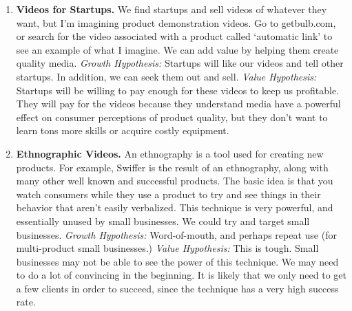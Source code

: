 \documentclass[paper=a4, fontsize=11pt]{scrartcl} %
\numberwithin{equation}{section} %
\numberwithin{figure}{section} %
\numberwithin{table}{section} %
\begin{document}
\begin{enumerate}
\item \textbf{Videos for Startups.}  We find startups and sell videos of whatever they want, but I'm imagining product demonstration videos.  Go to getbulb.com, or search for the video associated with a product called `automatic link' to see an example of what I imagine.  We can add value by helping them create quality media.  \textit{Growth Hypothesis:}  Startups will like our videos and tell other startups.  In addition, we can seek them out and sell. \textit{Value Hypothesis:}  Startups will be willing to pay enough for these videos to keep us profitable.  They will pay for the videos because they understand media have a powerful effect on consumer perceptions of product quality, but they don't want to learn tons more skills or acquire costly equipment.   

\item \textbf{Ethnographic Videos.}  An ethnography is a tool used for creating new products.  For example, Swiffer is the result of an ethnography, along with many other well known and successful products.  The basic idea is that you watch consumers while they use a product to try and see things in their behavior that aren't easily verbalized.  This technique is very powerful, and essentially unused by small businesses.  We could try and target small businesses. \textit{Growth Hypothesis:}  Word-of-mouth, and perhaps repeat use (for multi-product small businesses.) \textit{Value Hypothesis:}  This is tough.  Small businesses may not be able to see the power of this technique.  We may need to do a lot of convincing in the beginning.  It is likely that we only need to get a few clients in order to succeed, since the technique has a very high success rate.  


\end{enumerate}
\end{document}
